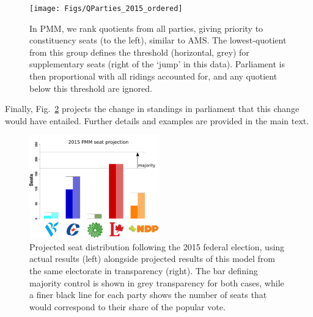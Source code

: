 \documentclass[DIV=calc, paper=a4, fontsize=11pt, twocolumn]{scrartcl}	 %
\begin{document}
\begin{figure}[h!]
\texttt{[image: Figs/QParties\_2015\_ordered]}
\caption{ In PMM, we rank quotients from all parties, giving priority to constituency seats (to the left), similar to AMS. The lowest-quotient from this group defines the threshold (horizontal, grey) for supplementary seats (right of the `jump' in this data). Parliament is then proportional with all ridings accounted for, and any quotient below this threshold are ignored.}
\label{fig:sumQParties-2015-ordered}
\end{figure}

Finally, Fig.~\ref{fig:hypo_2015_sum} projects the change in standings in parliament that this change would have entailed. Further details and examples are provided in the main text.

\begin{figure}[h!]
  \includegraphics[width=0.50\textwidth,clip]{Figs/2015_seat_projection}
  \caption{Projected seat distribution following the 2015 federal election, using actual results (left) alongside projected results of this model from the same electorate in transparency (right). The bar defining majority control is shown in grey transparency for both cases, while a finer black line for each party shows the number of seats that would correspond to their share of the popular vote.}
\label{fig:hypo_2015_sum}
\end{figure}

\pagebreak
\maketitle %
\thispagestyle{fancy} %

\end{document}
